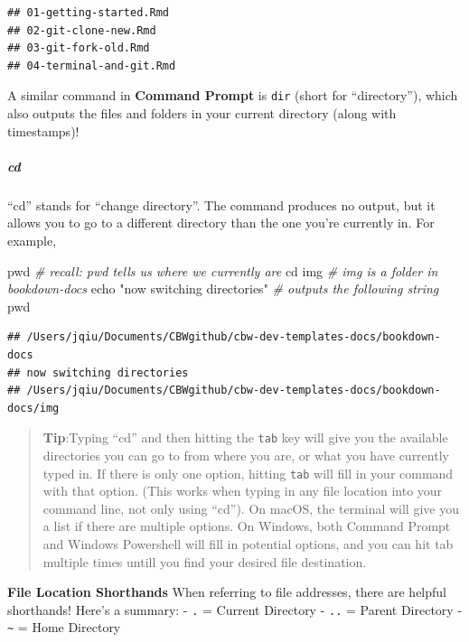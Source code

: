 \documentclass[
]{book}
\newenvironment{Shaded}{\begin{snugshade}}{\end{snugshade}}
\newcommand{\BuiltInTok}[1]{#1}
\newcommand{\CommentTok}[1]{\textcolor[rgb]{0.56,0.35,0.01}{\textit{#1}}}
\newcommand{\NormalTok}[1]{#1}
\newcommand{\StringTok}[1]{\textcolor[rgb]{0.31,0.60,0.02}{#1}}
\theoremstyle{definition}
\theoremstyle{definition}
\theoremstyle{definition}
\theoremstyle{definition}
\theoremstyle{remark}
\begin{document}
\begin{verbatim}
## 01-getting-started.Rmd
## 02-git-clone-new.Rmd
## 03-git-fork-old.Rmd
## 04-terminal-and-git.Rmd
\end{verbatim}

A similar command in \textbf{Command Prompt} is \texttt{dir} (short for ``directory''), which also outputs the files and folders in your current directory (along with timestamps)!

\subparagraph*{cd}\label{cd}

``cd'' stands for ``change directory''. The command produces no output, but it allows you to go to a different directory than the one you're currently in. For example,

\begin{Shaded}
\begin{Highlighting}[]
\BuiltInTok{pwd} \CommentTok{\# recall: pwd tells us where we currently are}
\BuiltInTok{cd}\NormalTok{ img }\CommentTok{\# img is a folder in bookdown{-}docs}
\BuiltInTok{echo} \StringTok{"now switching directories"} \CommentTok{\# outputs the following string}
\BuiltInTok{pwd}
\end{Highlighting}
\end{Shaded}

\begin{verbatim}
## /Users/jqiu/Documents/CBWgithub/cbw-dev-templates-docs/bookdown-docs
## now switching directories
## /Users/jqiu/Documents/CBWgithub/cbw-dev-templates-docs/bookdown-docs/img
\end{verbatim}

\begin{quote}
\textbf{Tip}:Typing ``cd'' and then hitting the \texttt{tab} key will give you the available directories you can go to from where you are, or what you have currently typed in. If there is only one option, hitting \texttt{tab} will fill in your command with that option. (This works when typing in any file location into your command line, not only using ``cd''). On macOS, the terminal will give you a list if there are multiple options. On Windows, both Command Prompt and Windows Powershell will fill in potential options, and you can hit tab multiple times untill you find your desired file destination.
\end{quote}

\textbf{File Location Shorthands} When referring to file addresses, there are helpful shorthands! Here's a summary: - \texttt{.} = Current Directory - \texttt{..} = Parent Directory - \texttt{\textasciitilde{}} = Home Directory
\end{document}
